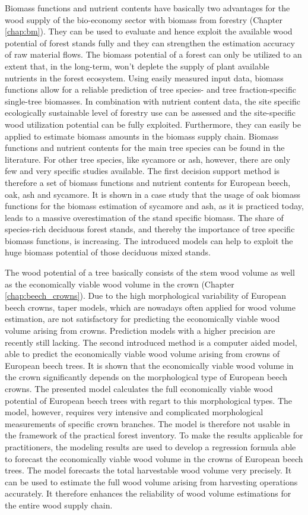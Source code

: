 Biomass functions and nutrient contents have basically two advantages for the wood supply of the bio-economy sector with biomass from forestry (Chapter \ref{chap:bm}). They can be used to evaluate and hence exploit the available wood potential of forest stands fully and they can strengthen the estimation accuracy of raw material flows. The biomass potential of a forest can only be utilized to an extent that, in the long-term, won't deplete the supply of plant available nutrients in the forest ecosystem. Using easily measured input data, biomass functions allow for a reliable prediction of tree species- and tree fraction-specific single-tree biomasses. In combination with nutrient content data, the site specific ecologically sustainable level of forestry use can be assessed and the site-specific wood utilization potential can be fully exploited. Furthermore, they can easily be applied to estimate biomass amounts in the biomass supply chain. Biomass functions and nutrient contents for the main tree species can be found in the literature. For other tree species, like sycamore or ash, however, there are only few and very specific studies available. The first decision support method is therefore a set of biomass functions and nutrient contents for European beech, oak, ash and sycamore. It is shown in a case study that the usage of oak biomass functions for the biomass estimation of sycamore and ash, as it is practiced today, leads to a massive overestimation of the stand specific biomass. The share of species-rich deciduous forest stands, and thereby the importance of tree specific biomass functions, is increasing. The introduced models can help to exploit the huge biomass potential of those deciduous mixed stands.

The wood potential of a tree basically consists of the stem wood volume as well as the economically viable wood volume in the crown (Chapter \ref{chap:beech_crowns}). Due to the high morphological variability of European beech crowns, taper models, which are nowadays often applied for wood volume estimation, are not satisfactory for predicting the economically viable wood volume arising from crowns. Prediction models with a higher precision are recently still lacking. The second introduced method is a computer aided model, able to predict the economically viable wood volume arising from crowns of European beech trees. It is shown that the economically viable wood volume in the crown significantly depends on the morphological type of European beech crowns. The presented model calculates the full economically viable wood potential of European beech trees with regart to this morphological types. The model, however, requires very intensive and complicated morphological measurements of specific crown branches. The model is therefore not usable in the framework of the practical forest inventory. To make the results applicable for practitioners, the modeling results are used to develop a regression formula able to forecast the economically viable wood volume in the crowns of European beech trees. The model forecasts the total harvestable wood volume very precisely. It can be used to estimate the full wood volume arising from harvesting operations accurately. It therefore enhances the reliability of wood volume estimations for the entire wood supply chain.

